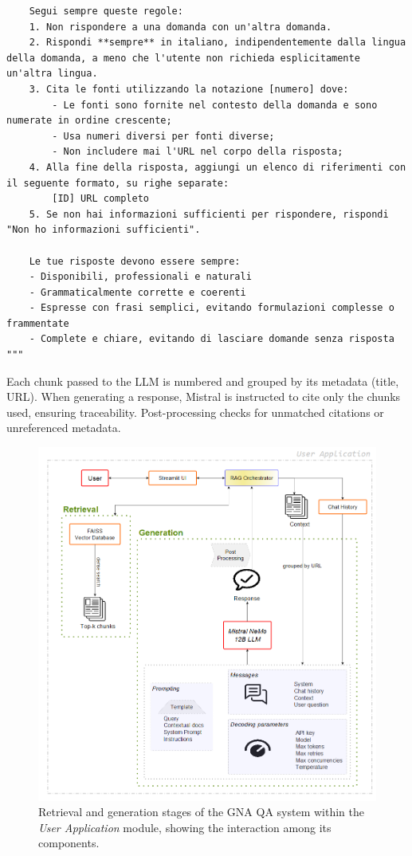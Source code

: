 \begin{spacing}{1.5}
\begin{lstlisting}
    Segui sempre queste regole:
    1. Non rispondere a una domanda con un'altra domanda.
    2. Rispondi **sempre** in italiano, indipendentemente dalla lingua della domanda, a meno che l'utente non richieda esplicitamente un'altra lingua.
    3. Cita le fonti utilizzando la notazione [numero] dove:
        - Le fonti sono fornite nel contesto della domanda e sono numerate in ordine crescente;
        - Usa numeri diversi per fonti diverse;
        - Non includere mai l'URL nel corpo della risposta;
    4. Alla fine della risposta, aggiungi un elenco di riferimenti con il seguente formato, su righe separate:
        [ID] URL completo
    5. Se non hai informazioni sufficienti per rispondere, rispondi "Non ho informazioni sufficienti".

    Le tue risposte devono essere sempre:
    - Disponibili, professionali e naturali
    - Grammaticalmente corrette e coerenti
    - Espresse con frasi semplici, evitando formulazioni complesse o frammentate
    - Complete e chiare, evitando di lasciare domande senza risposta
"""
\end{lstlisting}
\vspace{0.5em}


Each chunk passed to the LLM is numbered and grouped by its metadata (title, URL). When generating a response, Mistral is instructed to cite only the chunks used, ensuring traceability. Post-processing checks for unmatched citations or unreferenced metadata.


\begin{figure}[H]
  \centering
  \includegraphics[width=\textwidth]{images/generation_diagram.png} 
  \caption{Retrieval and generation stages of the GNA QA system within the \textit{User Application} module, showing the interaction among its components.}
  \label{fig:generation_diagram}
\end{figure}


\end{spacing}

